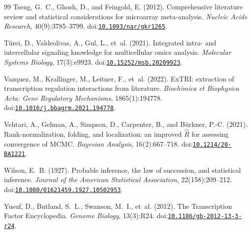 \documentclass[11pt,a4paper]{article}
\providecommand{\DIFaddend}{} %
\DeclareRobustCommand{\DIFaddend}{\DIFOaddend \let\includegraphics\DIFOincludegraphics} %
\begin{document}
\begin{thebibliography}{99}
Tseng, G.~C., Ghosh, D., and Feingold, E. (2012).
\newblock Comprehensive literature review and statistical considerations for microarray meta-analysis.
\newblock \emph{Nucleic Acids Research}, 40(9):3785--3799.
\newblock doi:\href{https://doi.org/10.1093/nar/gkr1265}{\nolinkurl{10.1093/nar/gkr1265}}.

T{\"u}rei, D., Valdeolivas, A., Gul, L., et~al. (2021).
\newblock Integrated intra- and intercellular signaling knowledge for multicellular omics analysis.
\newblock \emph{Molecular Systems Biology}, 17(3):e9923.
\newblock doi:\href{https://doi.org/10.15252/msb.20209923}{\nolinkurl{10.15252/msb.20209923}}.

Vazquez, M., Krallinger, M., Leitner, F., et~al. (2022).
\newblock ExTRI: extraction of transcription regulation interactions from literature.
\newblock \emph{Biochimica et Biophysica Acta: Gene Regulatory Mechanisms}, 1865(1):194778.
\newblock doi:\href{https://doi.org/10.1016/j.bbagrm.2021.194778}{\nolinkurl{10.1016/j.bbagrm.2021.194778}}.

Vehtari, A., Gelman, A., Simpson, D., Carpenter, B., and B{\"u}rkner, P.-C. (2021).
\newblock Rank-normalization, folding, and localization: an improved $\widehat{R}$ for assessing convergence of {MCMC}.
\newblock \emph{Bayesian Analysis}, 16(2):667--718.
\newblock doi:\href{https://doi.org/10.1214/20-BA1221}{\nolinkurl{10.1214/20-BA1221}}.

Wilson, E.~B. (1927).
\newblock Probable inference, the law of succession, and statistical inference.
\newblock \emph{Journal of the American Statistical Association}, 22(158):209--212.
\newblock doi:\href{https://doi.org/10.1080/01621459.1927.10502953}{\nolinkurl{10.1080/01621459.1927.10502953}}.

Yusuf, D., Butland, S.~L., Swanson, M.~I., et~al. (2012).
\newblock The Transcription Factor Encyclopedia.
\newblock \emph{Genome Biology}, 13(3):R24.
\newblock doi:\href{https://doi.org/10.1186/gb-2012-13-3-r24}{\nolinkurl{10.1186/gb-2012-13-3-r24}}.

\end{thebibliography}
\DIFaddend 
\end{document}
